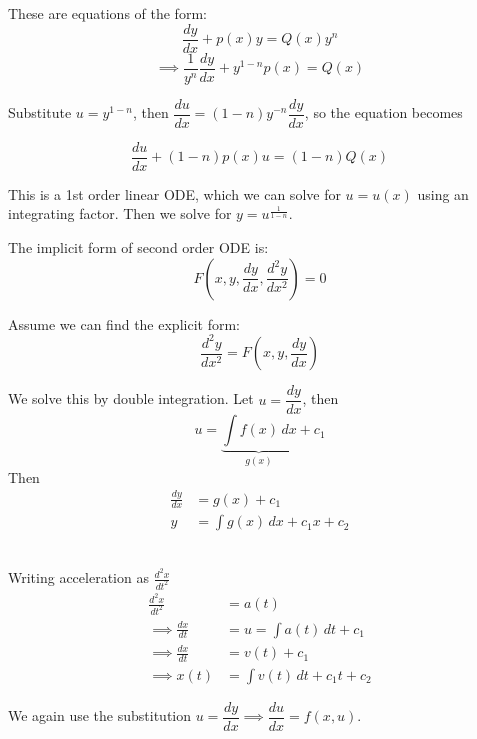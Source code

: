 \documentclass[10pt]{scrartcl}
\begin{document}

These are equations of the form: \[\dfrac{dy}{dx} + p(x)y = Q(x)y^n\]
\[\implies \frac{1}{y^n}\frac{dy}{dx} + y^{1-n}p(x) = Q(x)\]

Substitute $u = y^{1-n}$, then $\dfrac{du}{dx} = (1-n)y^{-n}\dfrac{dy}{dx}$, so the equation becomes

\[  \frac{du}{dx} + (1-n)p(x)u = (1-n)Q(x)\]

This is a 1st order linear ODE, which we can solve for $u = u(x)$ using an integrating factor. Then we solve for $y = u^{\frac{1}{1-n}}$. 


The implicit form of second order ODE is:
\[F\left(x,y,\frac{dy}{dx}, \frac{d^2y}{dx^2}\right) = 0\]

Assume we can find the explicit form: 
\[\frac{d^2y}{dx^2} = F\left(x,y,\frac{dy}{dx}\right)\]


We solve this by double integration. Let $u = \dfrac{dy}{dx}$, then 
\[u = \underbrace{\int f(x)\,dx}_{g(x)} + c_1\]
Then 
\[\begin{aligned}\frac{dy}{dx} &= g(x) + c_1\\
y &= \int g(x)\,dx + c_1x + c_2	
\end{aligned}
\]~

\begin{example}[Mechanics] Writing acceleration as $\frac{d^2x}{dt^2}$
	\[
\begin{aligned}
  \frac{d^2x}{dt^2} &= a(t)\\[.2cm]
\implies   \frac{dx}{dt} &= u = \int a(t)\,dt + c_1\\[.2cm]
\implies  \frac{dx}{dt} &= v(t) + c_1\\[.2cm]
\implies   x(t) &= \int v(t)\,dt + c_1t + c_2
\end{aligned}
\]
\end{example}


We again use the substitution $u = \dfrac{dy}{dx} \implies \dfrac{du}{dx} = f(x,u).$\\[.2cm]
\end{document}
